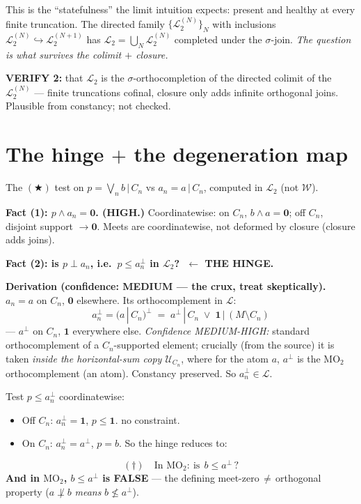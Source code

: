 \documentclass[11pt]{article}
\newcommand{\MOtwo}{\mathrm{MO}_2}
\newcommand{\hinge}{(\dagger)}
\newcommand{\Lt}{\mathcal{L}_2}
\newcommand{\Ucal}{\mathcal{U}}
\newcommand{\Wcal}{\mathcal{W}}
\newcommand{\Lcal}{\mathcal{L}}
\begin{document}
\noindent This is the ``statefulness'' the limit intuition expects: present and
healthy at every finite truncation. The directed family $\{\Lt^{(N)}\}_N$ with
inclusions $\Lt^{(N)}\hookrightarrow\Lt^{(N+1)}$ has $\Lt=\bigcup_N\Lt^{(N)}$
completed under the $\sigma$-join. \emph{The question is what survives the
colimit $+$ closure.}

\begin{verify}
\noindent\textbf{VERIFY 2:} that $\Lt$ is the $\sigma$-orthocompletion of the
directed colimit of the $\Lt^{(N)}$ --- finite truncations cofinal, closure
only adds infinite orthogonal joins. Plausible from constancy; not checked.
\end{verify}

\section{The hinge $+$ the degeneration map \quad{\normalfont\small[verdict]}}

The $(\bigstar)$ test on $p=\bigvee_n b\,|\,C_n$ vs $a_n=a\,|\,C_n$, computed
in $\Lt$ (not $\Wcal$).

\medskip
\noindent\textbf{Fact (1): $p\wedge a_n=\mathbf 0$. (HIGH.)} Coordinatewise: on
$C_n$, $b\wedge a=\mathbf 0$; off $C_n$, disjoint support $\to\mathbf 0$. Meets
are coordinatewise, not deformed by closure (closure adds joins). \checkmark

\medskip
\noindent\textbf{Fact (2): is $p\perp a_n$, i.e.\ $p\le a_n^\perp$ in $\Lt$?
$\;\leftarrow$ THE HINGE.}

\noindent\textbf{Derivation \textnormal{(confidence: MEDIUM --- the crux,
treat skeptically).}} $a_n=a$ on $C_n$, $\mathbf 0$ elsewhere. Its
orthocomplement in $\Lcal$:
\[
  a_n^\perp=(a\,|\,C_n)^\perp
  \;=\; a^\perp\,|\,C_n \;\vee\; \mathbf 1\,|\,(M\setminus C_n)
\]
--- $a^\perp$ on $C_n$, $\mathbf 1$ everywhere else. \emph{Confidence
MEDIUM-HIGH:} standard orthocomplement of a $C_n$-supported element; crucially
(from the source) it is taken \emph{inside the horizontal-sum copy
$\Ucal_{C_n}$}, where for the atom $a$, $a^\perp$ is the $\MOtwo$
orthocomplement (an atom). Constancy preserved. So $a_n^\perp\in\Lcal$.
\checkmark

Test $p\le a_n^\perp$ coordinatewise:
\begin{itemize}[noitemsep]
  \item Off $C_n$: $a_n^\perp=\mathbf 1$, $p\le\mathbf 1$. \checkmark no constraint.
  \item On $C_n$: $a_n^\perp=a^\perp$, $p=b$. So the hinge reduces to:
\end{itemize}
\[
\boxed{\;\hinge\quad\text{In }\MOtwo:\ \text{is}\ \ b\le a^\perp\,?\;}
\]
\textbf{And in $\MOtwo$, $b\le a^\perp$ is FALSE} --- the defining
meet-zero$\,\neq\,$orthogonal property ($a\not\perp b$ \emph{means}
$b\not\le a^\perp$).
\end{document}
